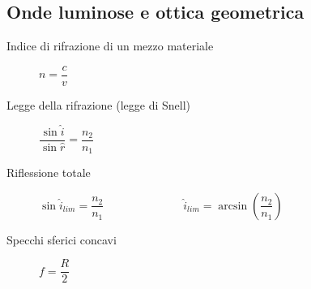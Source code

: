\documentclass[a4paper,11pt,italian]{article}
\begin{document}
\subsection{Onde luminose e ottica geometrica}

\begin{description}
%   
%   
  
  \item[Indice di rifrazione di un mezzo materiale] $ n = \dfrac{c}{v} $
  
  \item[Legge della rifrazione (legge di Snell)] $ \dfrac{\sin \hat{i} }{\sin \hat{r}} = \dfrac{n_2}{n_1} $
  
  \item[Riflessione totale] $ \sin \hat{i}_{lim} = \dfrac{n_2}{n_1} $~~~~~~~~~~~~~~$ \hat{i}_{lim} = \arcsin \left( \dfrac{n_2}{n_1} \right) $
  
%   
  
  \item[Specchi sferici concavi] $ f = \dfrac{R}{2} $
  

\end{description}
\end{document}
